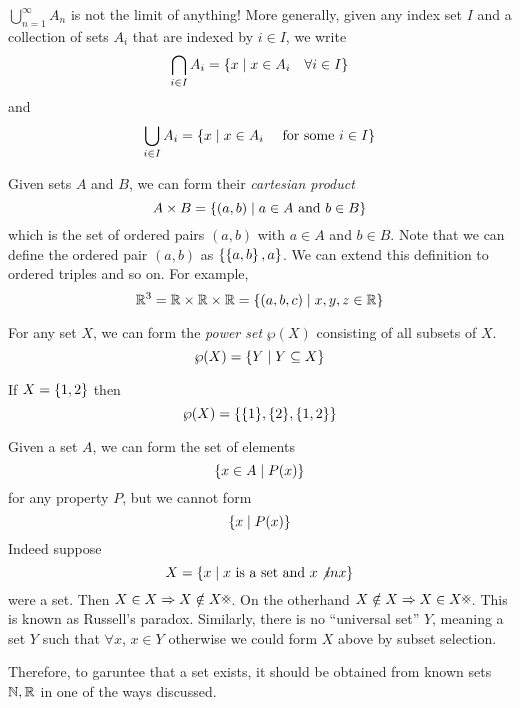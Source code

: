 \documentclass{article}
\begin{document}
\begin{warning}
    $\bigcup_{n=1}^\infty A_n$ is not the limit of anything!
    More generally, given any index set $I$ and a collection of sets $A_i$ that are indexed by $i \in I$, we write
    \[
        \bigcap_{i \in I} A_i = \left\{ x \mid x \in A_i \quad \forall i \in I \right\}
    \]
    and
    \[
        \bigcup_{i \in I} A_i = \left\{ x \mid x \in A_i \quad \text{ for some } i \in I \right\}
    \]
\end{warning}

\begin{defi}
    Given sets $A$ and $B$, we can form their \emph{cartesian product}
    \[
        A \times B = \left\{ (a, b) \mid a \in A \text{ and } b \in B \right\}  
    \]
    which is the set of ordered pairs $(a, b)$ with $a \in A$ and $b \in B$.
    Note that we can define the ordered pair $(a, b)$ as $\left\{ \left\{ a, b \right\}, a \right\}$.
    We can extend this definition to ordered triples and so on. For example,
    \[
        \mathbb{R}^3 = \mathbb{R} \times \mathbb{R} \times \mathbb{R} = \left\{ (a, b, c) \mid x, y, z \in \mathbb{R} \right\}
    \]
\end{defi}


\begin{defi}
    For any set $X$, we can form the \emph{power set} $\wp(X)$ consisting of all subsets of $X$.
    \[
        \wp(X) = \left\{ Y \mid Y \subseteq X \right\}
    \]
\end{defi}
\begin{eg}
    If $X = \left\{ 1, 2 \right\}$ then
    \[
        \wp(X) = \left\{ \{1\}, \{2\}, \{1, 2\} \right\}  
    \]
\end{eg}
\begin{warning}
    Given a set $A$, we can form the set of elements
    \[
        \left\{ x \in A \mid P(x) \right\}  
    \]
    for any property $P$, but we cannot form
    \[
        \left\{ x \mid P(x) \right\}  
    \]
    Indeed suppose
    \[
        X = \left\{ x \mid x \text{ is a set and } x \not in x \right\}  
    \]
    were a set.
    Then $X \in X \Rightarrow X \notin X \contradiction$.
    On the otherhand $X \notin X \Rightarrow X \in X \contradiction$.
    This is known as Russell's paradox. 
    Similarly, there is no ``universal set'' $Y$, meaning a set $Y$ such that $\forall x$, $x \in Y$
    otherwise we could form $X$ above by subset selection.

    Therefore, to garuntee that a set exists, it should be obtained from known sets $\mathbb{N}, \mathbb{R}$ in one of the ways discussed.
\end{warning}
\end{document}
